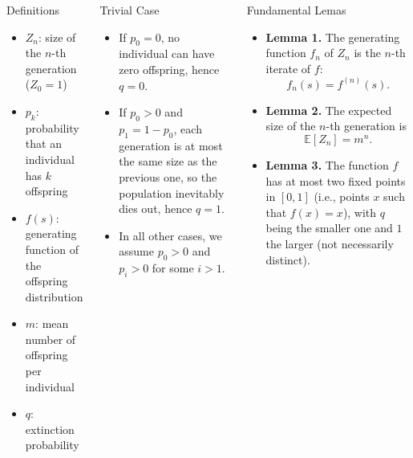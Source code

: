 \documentclass[palette=none,mode=dark]{impaTeXPoster}
\begin{document}
\begin{columns}
\begin{postercard}{Definitions}
    
    \begin{itemize}
        \item \(Z_n\): size of the \(n\)-th generation (\(Z_0 = 1\))
        \item \(p_k\): probability that an individual has \(k\) offspring
        \item \(f(s)\): generating function of the offspring distribution
        \item \(m\): mean number of offspring per individual
        \item \(q\): extinction probability
    \end{itemize}

\end{postercard}

\begin{postercard}{Trivial Case}
    
    \begin{itemize}
        \item If \(p_0 = 0\), no individual can have zero offspring, hence \(q = 0\).
        \item If \(p_0 > 0\) and \(p_1 = 1 - p_0\), each generation is at most the same size as the previous one, so the population inevitably dies out, hence \(q = 1\).
        \item In all other cases, we assume \(p_0 > 0\) and \(p_i > 0\) for some \(i > 1\).
    \end{itemize}

\end{postercard}

\begin{postercard}{Fundamental Lemas}

    \begin{itemize}
    
    \item \textbf{Lemma 1.}  
    The generating function $f_n$ of \(Z_n\) is the \(n\)-th iterate of \(f\):
    \[
    f_n(s) = f^{(n)}(s).
    \]
    
    \item \textbf{Lemma 2.}  
    The expected size of the \(n\)-th generation is
    \[
    \mathbb{E}[Z_n] = m^n.
    \]
    
    \item \textbf{Lemma 3.}  
    The function \(f\) has at most two fixed points in \([0,1]\) (i.e., points $x$ such that $f(x)=x$), with $q$ being the smaller one and $1$ the larger (not necessarily distinct).
    

\end{itemize}
\end{postercard}
\end{columns}
\end{document}
